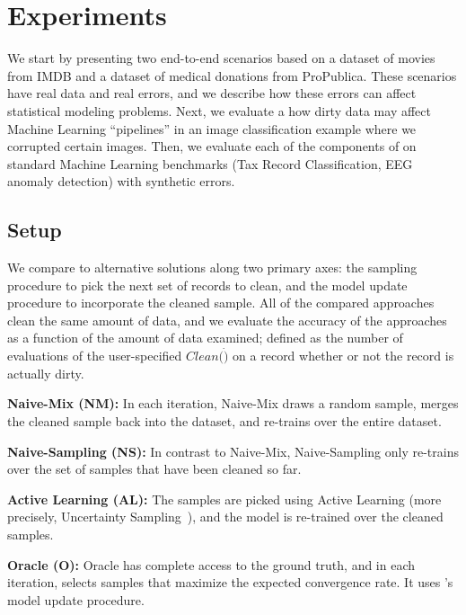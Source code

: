 \section{Experiments}\label{eval}
We start by presenting two end-to-end scenarios based on a dataset of movies from IMDB and a dataset of medical donations from ProPublica.
These scenarios have real data and real errors, and we describe how these errors can affect statistical modeling problems.
Next, we evaluate a how dirty data may affect Machine Learning ``pipelines'' in an image classification example where we corrupted certain images.
Then, we evaluate each of the components of \sys on standard Machine Learning benchmarks (Tax Record Classification, EEG anomaly detection) with synthetic errors.

\subsection{Setup}
We compare \sys to alternative solutions along two primary axes: the sampling procedure to pick the next set of records to clean, and the model update procedure to incorporate the cleaned sample.
All of the compared approaches clean the same amount of data, and we evaluate the accuracy of the approaches as a function of the amount of data examined; defined as the number of evaluations of the user-specified $Clean(\dot)$ on a record whether or not the record is actually dirty.

\vspace{0.25em}
\noindent\textbf{Naive-Mix (NM): } In each iteration, Naive-Mix  draws a random sample, merges the cleaned sample back into the dataset, and re-trains over the entire dataset.

\vspace{0.25em}
\noindent\textbf{Naive-Sampling (NS): } In contrast to Naive-Mix, Naive-Sampling only re-trains over the set of samples that have been cleaned so far.

\vspace{0.25em}
\noindent\textbf{Active Learning (AL): }
The samples are picked using Active Learning (more precisely, Uncertainty Sampling~\cite{settles2010active}), and the model is re-trained over the cleaned samples.

\vspace{0.25em}
\noindent\textbf{Oracle (O): } Oracle has complete access to the ground truth, and in each iteration, selects samples that maximize the expected convergence rate.  It uses \sys's model update procedure.  

